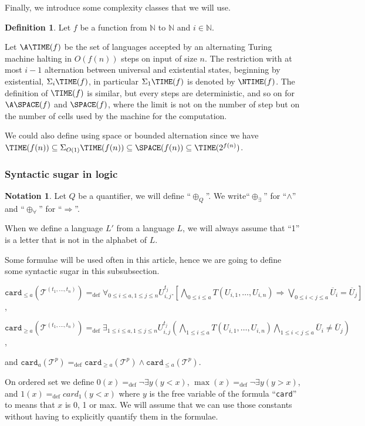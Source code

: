 \documentclass[a4paper,12pt]{article}
\newcommand{\sss}[1]{\subsubsection{#1}}
\theoremstyle{definition}
\newtheorem{definition}[theorem]{Definition}
\newtheorem{notation}[theorem]{Notation}
\newcommand{\ATIME}[2]{\ensuremath{\Sigma_{#2}\TIME(#1)}}
\newcommand{\N}{\ensuremath{\mathbb N}}
\newcommand{\mc}{\mathcal}
\newcommand{\ol}{\overline}
\newcommand{\ed}{=_{\mathrm{def}}}
\begin{document}
Finally, we introduce some complexity classes that we will use.
\begin{definition}
  Let $f$ be a function from $\N$ to $\N$ and $i\in\N$.


  Let $\A\TIME(f)$ be the set of languages accepted by an alternating
  Turing machine halting in $O(f(n))$ steps on input of size $n$. The
  restriction with at most $i-1$ alternation between universal and
  existential states, beginning by existential, $\Sigma_{i}\TIME(f)$,
  in particular $\Sigma_{1}\TIME(f)$ is denoted by $\NTIME(f)$. The
  definition of $\TIME(f)$ is similar, but every steps are
  deterministic, and so on for $\A\SPACE(f)$ and $\SPACE(f)$, where
  the limit is not on the number of step but on the number of cells
  used by the machine for the computation.

  
\end{definition}

We could also define \ELEMENTARY{} using space or bounded alternation
since we have $\TIME(f(n))\subseteq\ATIME{f(n)}{O(1)}\subseteq
\SPACE(f(n))\subseteq\TIME(2^{f(n)})$.

\sss{Syntactic sugar in logic}
\begin{notation}
  Let $Q$ be a quantifier, we will define ``$\oplus_{Q}$''.  We
  write``$\oplus_{\exists}$'' for ``$\land$'' and
  ``$\oplus_{\forall}$'' for ``$\Rightarrow$''.

  When we define a language $L'$ from a language $L$, we will always
  assume that ``1'' is a letter that is not in the alphabet of $L$.
\end{notation}


Some formulae will be used often in this article, hence we are going
to define some syntactic sugar in this subsubsection.

$\texttt{card}_{\le a}(\mc T^{(t_{1},\dots,t_{n})})\ed\forall_{0\le i\le
  a, 1\le j\le n}U_{i,j}^{t_{j}}.[\bigwedge_{0\le i\le a} T(U_{i,1},\dots,U_{i,n})\Rightarrow\bigvee_{0\le
  i<j\le a}\ol U_{i}=\ol U_{j}]$,

$\texttt{card}_{\ge a}(\mc T^{(t_{1},\dots,t_{n})})\ed\exists_{1\le i\le
  a, 1\le j\le n}U_{i,j}^{t_{j}}(\bigwedge_{1\le i\le a} T(U_{i,1},\dots,U_{i,n})\bigwedge_{1\le i<j\le a}\ol U_{i}\ne \ol U_{j})$,

and $\texttt{card}_{a}(\mc T^{p})\ed\texttt{card}_{\ge a}(\mc
T^{p})\land \texttt{card}_{\le a}(\mc T^{p})$.

On ordered set we define $0(x)\ed\neg \exists y (y<x)$,
$\max(x)\ed\neg \exists y (y>x)$, and $1(x)\ed card_{1}(y<x)$ where
$y$ is the free variable of the formula ``\texttt{card}'' to means
that $x$ is 0, 1 or max. We will assume that we can use those constants
without having to explicitly quantify them in the formulae.
\end{document}
